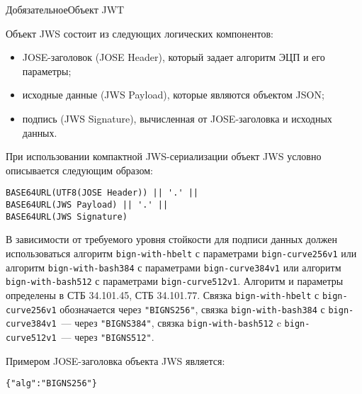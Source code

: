 \begin{appendix}{Д}{обязательное}{Объект JWT}
\label{JWT.JWS}
% 

Объект JWS состоит из следующих логических компонентов:
\begin{itemize}
\item
JOSE-заголовок (JOSE Header), который задает алгоритм ЭЦП и его параметры;
\item
исходные данные (JWS Payload), которые являются объектом JSON;
\item
подпись (JWS Signature), вычисленная от JOSE-заголовка и исходных данных.
\end{itemize}

При использовании компактной JWS-сериализации 
объект JWS условно описывается следующим образом:
\begin{lstlisting}
BASE64URL(UTF8(JOSE Header)) || '.' ||
BASE64URL(JWS Payload) || '.' ||
BASE64URL(JWS Signature)
\end{lstlisting}

В зависимости от требуемого уровня стойкости для подписи данных должен использоваться 
алгоритм \lstinline{bign-with-hbelt} с параметрами \lstinline{bign-curve256v1}
или алгоритм \lstinline{bign-with-bash384} с параметрами \lstinline{bign-curve384v1} 
или алгоритм \lstinline{bign-with-bash512} с параметрами \lstinline{bign-curve512v1}. 
Алгоритм и параметры определены в СТБ 34.101.45, СТБ 34.101.77.
%
Связка \lstinline{bign-with-hbelt} с \lstinline{bign-curve256v1} обозначается 
через \lstinline{"BIGNS256"},  
связка \lstinline{bign-with-bash384} с \lstinline{bign-curve384v1}~--- 
через \lstinline{"BIGNS384"},
связка \lstinline{bign-with-bash512} c \lstinline{bign-curve512v1}~--- 
через \lstinline{"BIGNS512"}.

Примером JOSE-заголовка объекта JWS является:
\begin{lstlisting}
{"alg":"BIGNS256"}
\end{lstlisting}



\end{appendix}

